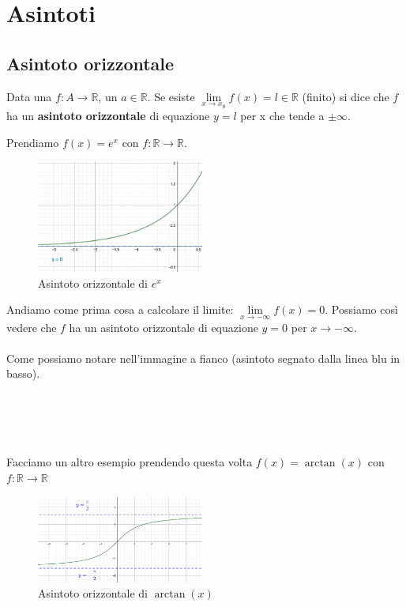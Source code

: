 \newpage
\section{Asintoti}

\subsection{Asintoto orizzontale}
\begin{definition}
Data una $f: A \to \mathbb{R}$, un $a \in \mathbb{R}$. Se esiste $\lim\limits_{x\to x_0}f(x) = l \in \mathbb{R}$ (finito) si dice che $f$ ha un \textbf{asintoto orizzontale} di equazione $y = l$ per x che tende a $\pm\infty$.
\end{definition}
\begin{example}
Prendiamo $f(x) = e^x$ con $f:\mathbb{R}\to \mathbb{R}$.
\end{example}
\begin{figure}
    \vspace{-5pt}
    \centering
    \includegraphics[width=5.5cm]{images/asintoto-esponenziale.png}
    \caption{Asintoto orizzontale di $e^x$}
\end{figure}

Andiamo come prima cosa a calcolare il limite: $\lim\limits_{x\to -\infty}f(x) = 0$.
Possiamo così vedere che $f$ ha un asintoto orizzontale di equazione $y=0$ per $x\to -\infty$. \\\\
Come possiamo notare nell'immagine a fianco (asintoto segnato dalla linea blu in basso).\\\\\\\\\\

\begin{example}
Facciamo un altro esempio prendendo questa volta $f(x) = \arctan(x)$ con $f: \mathbb{R}\to \mathbb{R}$
\end{example}
\begin{figure}
    \vspace{-5pt}
    \centering
    \includegraphics[width=5.5cm]{images/asintoto-arctan.png}
    \caption{Asintoto orizzontale di $\arctan(x)$}
\end{figure}

